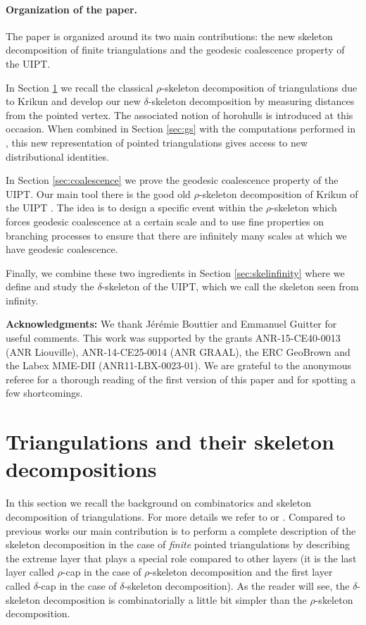 \documentclass[10pt]{amsart}
\theoremstyle{definition}\newtheorem{defi}[theo]{Definition}\newtheorem{rema}[theo]{Remark}\newtheorem{exam}[theo]{Example}\newtheorem{exem}[theo]{Example}\newtheorem{nota}[theo]{Notation}
\begin{document}
\paragraph{Organization of the paper.} The paper is organized around its two main contributions: the new skeleton decomposition of finite triangulations and the geodesic coalescence property of the UIPT.

In Section \ref{sec:skeletongeneral} we recall the classical $\rho$-skeleton decomposition of triangulations due to Krikun and develop our new $\delta$-skeleton decomposition by measuring distances from the pointed vertex. The associated notion of horohulls is introduced at this occasion. When combined  in Section \ref{sec:gs} with the computations performed in \cite{M}, this new representation of pointed triangulations gives access to new distributional identities.

In Section \ref{sec:coalescence} we prove the geodesic coalescence property of the UIPT. Our main tool there is the good old $\rho$-skeleton decomposition of Krikun of the UIPT \cite{Kr}. The idea is to design a specific event within the $\rho$-skeleton which forces geodesic coalescence at a certain scale and to use fine properties on branching processes to ensure that there are infinitely many scales at which we have geodesic coalescence.

Finally, we combine these two ingredients in Section \ref{sec:skelinfinity} where we define and study the $\delta$-skeleton of the UIPT, which we call the skeleton seen from infinity.

\bigskip

\noindent \textbf{Acknowledgments:} We thank J\'er\'emie Bouttier and Emmanuel Guitter for useful comments. This work was supported by the grants ANR-15-CE40-0013 (ANR Liouville),
ANR-14-CE25-0014 (ANR GRAAL), the ERC GeoBrown and the Labex MME-DII (ANR11-LBX-0023-01). {We are grateful to the anonymous referee for a thorough reading of the first version of this paper and for spotting a few shortcomings.}

\tableofcontents


\section{Triangulations and their skeleton decompositions} \label{sec:skeletongeneral}
In this section we recall the background on combinatorics and skeleton decomposition of triangulations. For more details we refer to \cite{CLGfpp} or \cite{M}. Compared to previous works our main contribution is to perform a complete description of the skeleton decomposition in the case of \emph{finite} pointed triangulations by describing the extreme layer that plays a special role compared to other layers (it is the last layer called $\rho$-cap in the case of $\rho$-skeleton decomposition and the first layer called $\delta$-cap in the case of $\delta$-skeleton decomposition). As the reader will see, the $\delta$-skeleton decomposition is combinatorially a little bit simpler than the $\rho$-skeleton decomposition.
\end{document}

